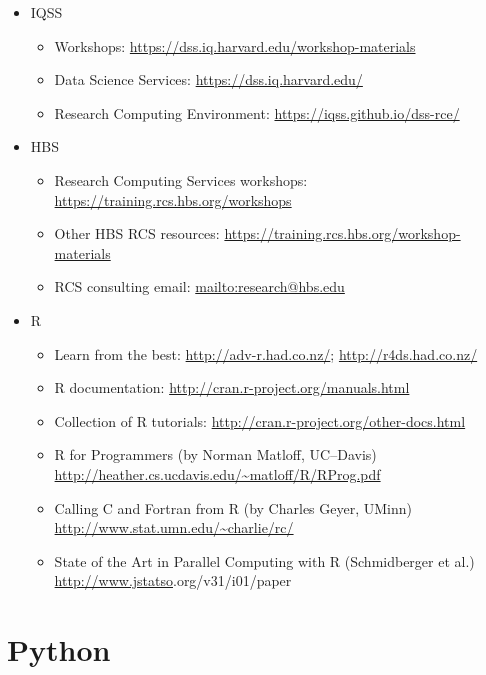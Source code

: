 \documentclass[
]{book}
\providecommand{\tightlist}{%
  \setlength{\itemsep}{0pt}\setlength{\parskip}{0pt}}
\begin{document}
\begin{itemize}
\tightlist
\item
  IQSS

  \begin{itemize}
  \tightlist
  \item
    Workshops: \url{https://dss.iq.harvard.edu/workshop-materials}
  \item
    Data Science Services: \url{https://dss.iq.harvard.edu/}
  \item
    Research Computing Environment: \url{https://iqss.github.io/dss-rce/}
  \end{itemize}
\item
  HBS

  \begin{itemize}
  \tightlist
  \item
    Research Computing Services workshops: \url{https://training.rcs.hbs.org/workshops}
  \item
    Other HBS RCS resources: \url{https://training.rcs.hbs.org/workshop-materials}
  \item
    RCS consulting email: \url{mailto:research@hbs.edu}
  \end{itemize}
\item
  R

  \begin{itemize}
  \tightlist
  \item
    Learn from the best: \url{http://adv-r.had.co.nz/}; \url{http://r4ds.had.co.nz/}
  \item
    R documentation: \url{http://cran.r-project.org/manuals.html}
  \item
    Collection of R tutorials: \url{http://cran.r-project.org/other-docs.html}
  \item
    R for Programmers (by Norman Matloff, UC--Davis) \url{http://heather.cs.ucdavis.edu/~matloff/R/RProg.pdf}
  \item
    Calling C and Fortran from R (by Charles Geyer, UMinn) \url{http://www.stat.umn.edu/~charlie/rc/}
  \item
    State of the Art in Parallel Computing with R (Schmidberger et al.) \url{http://www.jstatso}\textbar.org/v31/i01/paper
  \end{itemize}
\end{itemize}

\hypertarget{part-python}{%
\part{Python}\label{part-python}}
\end{document}
